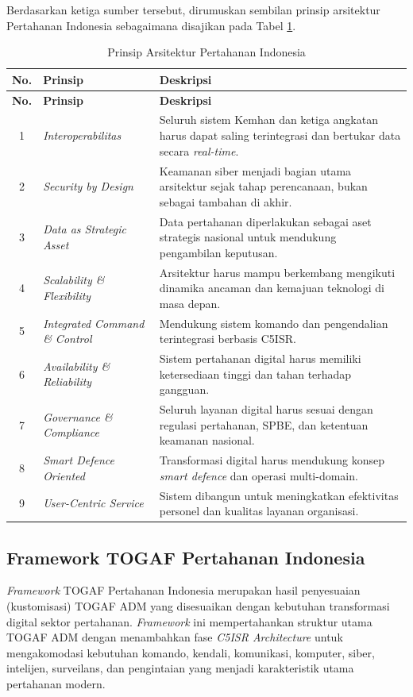 Berdasarkan ketiga sumber tersebut, dirumuskan sembilan prinsip arsitektur Pertahanan Indonesia sebagaimana disajikan pada Tabel \ref{tab:prinsip-arsitektur}.

\begin{longtable}{|c|p{3.4cm}|p{8cm}|}
\caption{Prinsip Arsitektur Pertahanan Indonesia}
\label{tab:prinsip-arsitektur} \\
\hline
\textbf{No.} & \textbf{Prinsip} & \textbf{Deskripsi} \\
\hline
\endfirsthead
\hline
\textbf{No.} & \textbf{Prinsip} & \textbf{Deskripsi} \\
\hline
\endhead
1 & \textit{Interoperabilitas} & Seluruh sistem Kemhan dan ketiga angkatan harus dapat saling terintegrasi dan bertukar data secara \textit{real-time}. \\
\hline
2 & \textit{Security by Design} & Keamanan siber menjadi bagian utama arsitektur sejak tahap perencanaan, bukan sebagai tambahan di akhir. \\
\hline
3 & \textit{Data as Strategic Asset} & Data pertahanan diperlakukan sebagai aset strategis nasional untuk mendukung pengambilan keputusan. \\
\hline
4 & \textit{Scalability \& Flexibility} & Arsitektur harus mampu berkembang mengikuti dinamika ancaman dan kemajuan teknologi di masa depan. \\
\hline
5 & \textit{Integrated Command \& Control} & Mendukung sistem komando dan pengendalian terintegrasi berbasis C5ISR. \\
\hline
6 & \textit{Availability \& Reliability} & Sistem pertahanan digital harus memiliki ketersediaan tinggi dan tahan terhadap gangguan. \\
\hline
7 & \textit{Governance \& Compliance} & Seluruh layanan digital harus sesuai dengan regulasi pertahanan, SPBE, dan ketentuan keamanan nasional. \\
\hline
8 & \textit{Smart Defence Oriented} & Transformasi digital harus mendukung konsep \textit{smart defence} dan operasi multi-domain. \\
\hline
9 & \textit{User-Centric Service} & Sistem dibangun untuk meningkatkan efektivitas personel dan kualitas layanan organisasi. \\
\hline
\end{longtable}

\subsection{Framework TOGAF Pertahanan Indonesia}
\textit{Framework} TOGAF Pertahanan Indonesia merupakan hasil penyesuaian (kustomisasi) TOGAF ADM yang disesuaikan dengan kebutuhan transformasi digital sektor pertahanan.
\textit{Framework} ini mempertahankan struktur utama TOGAF ADM dengan menambahkan fase \textit{C5ISR Architecture} untuk mengakomodasi kebutuhan komando, kendali, komunikasi, komputer, siber, intelijen, surveilans, dan pengintaian yang menjadi karakteristik utama pertahanan modern.

